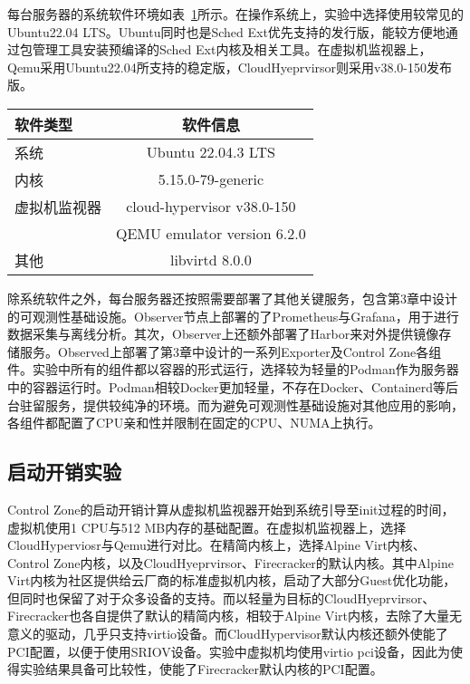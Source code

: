 每台服务器的系统软件环境如表~\ref{tab:system_env}所示。在操作系统上，实验中选择使用较常见的Ubuntu22.04 LTS。Ubuntu同时也是Sched Ext优先支持的发行版，能较方便地通过包管理工具安装预编译的Sched Ext内核及相关工具。在虚拟机监视器上，Qemu采用Ubuntu22.04所支持的稳定版，CloudHyeprvirsor则采用v38.0-150发布版。

\begin{table}[H]
    \label{tab:system_env}
    \footnotesize%
    \setlength{\tabcolsep}{30pt}%
    \renewcommand{\arraystretch}{1.25}%
    \centering
    \begin{tabular}{lc}
        \hline
        软件类型 & 软件信息 \\
        \hline
        系统 & Ubuntu 22.04.3 LTS  \\
        内核 & 5.15.0-79-generic \\
        虚拟机监视器 & cloud-hypervisor v38.0-150 \\
                   & QEMU emulator version 6.2.0 \\
        其他        & libvirtd 8.0.0 \\
        \hline
    \end{tabular}
\end{table}

除系统软件之外，每台服务器还按照需要部署了其他关键服务，包含第3章中设计的可观测性基础设施。Observer节点上部署的了Prometheus与Grafana，用于进行数据采集与离线分析。其次，Observer上还额外部署了Harbor来对外提供镜像存储服务。Observed上部署了第3章中设计的一系列Exporter及Control Zone各组件。实验中所有的组件都以容器的形式运行，选择较为轻量的Podman作为服务器中的容器运行时。Podman相较Docker更加轻量，不存在Docker、Containerd等后台驻留服务，提供较纯净的环境。而为避免可观测性基础设施对其他应用的影响，各组件都配置了CPU亲和性并限制在固定的CPU、NUMA上执行。

\subsection{启动开销实验}

Control Zone的启动开销计算从虚拟机监视器开始到系统引导至init过程的时间，虚拟机使用1 CPU与512 MB内存的基础配置。在虚拟机监视器上，选择CloudHyperviosr与Qemu进行对比。在精简内核上，选择Alpine Virt内核、Control Zone内核，以及CloudHyeprvirsor、Firecracker的默认内核。其中Alpine Virt内核为社区提供给云厂商的标准虚拟机内核，启动了大部分Guest优化功能，但同时也保留了对于众多设备的支持。而以轻量为目标的CloudHyeprvirsor、Firecracker也各自提供了默认的精简内核，相较于Alpine Virt内核，去除了大量无意义的驱动，几乎只支持virtio设备。而CloudHypervisor默认内核还额外使能了PCI配置，以便于使用SRIOV设备。实验中虚拟机均使用virtio pci设备，因此为使得实验结果具备可比较性，使能了Firecracker默认内核的PCI配置。

